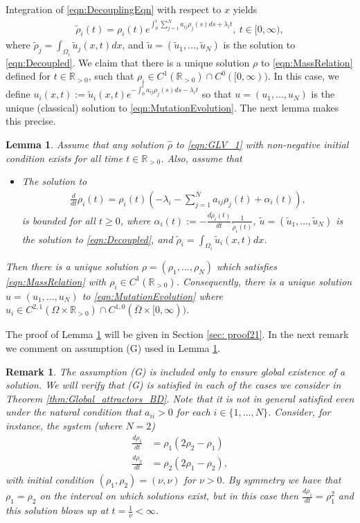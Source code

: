 \documentclass{article}
\newtheorem{lemma}{Lemma}[section]
\newtheorem{rmk}{Remark}[section]
\begin{document}
Integration of \eqref{eqn:DecouplingEqn} with respect to $x$ yields
\begin{align}\label{eqn:MassRelation}
    \tilde{\rho}_i(t)=\rho_i(t)e^{\int_{0}^t\sum_{j=1}^Na_{ij}\rho_j(s)ds+\lambda_it},~t\in[0,\infty),
\end{align}
where $\tilde{\rho}_j=\int_{\Omega_i}\tilde{u}_j(x,t)dx$, and $\tilde{u}=(\tilde{u}_1,...,\tilde{u}_N)$ is the solution to \eqref{eqn:Decoupled}. We claim that there is a unique solution $\rho$ to \eqref{eqn:MassRelation} defined for $t\in\mathbb{R}_{>0}$, such that $\rho_i\in{}C^1(\mathbb{R}_{>0})\cap{}C^0([0,\infty))$. In this case, we define
$u_i(x,t):=\tilde{u}_i(x,t)e^{-\int_{0}^ta_{ij}\rho_j(s)ds-\lambda_it}$ so that $u=(u_1,...,u_N)$ is the unique (classical) solution to \eqref{eqn:MutationEvolution}. The next lemma makes this precise.
\begin{lemma}\label{lma:MassEquivalent}
Assume that any solution $\hat{\rho}$ to 
\eqref{eqn:GLV_1}
with non-negative initial condition exists for all time $t\in\mathbb{R}_{>0}$. Also, assume that
\begin{itemize}
   \item[(G)] {The solution to}
        \begin{align*}
        \frac{d}{dt}\rho_i(t)=\rho_i(t)\left(-\lambda_i-\sum_{j=1}^Na_{ij}\rho_j(t)+\alpha_i(t)\right),
    \end{align*} 
     {is bounded for all $t\geq{0}$, where $\alpha_i(t):=-\frac{d\tilde{\rho}_i(t)}{dt}\frac{1}{\tilde{\rho}_i(t)}$, $\tilde{u}=(\tilde{u}_1,...,\tilde{u}_N)$ is the solution to \eqref{eqn:Decoupled}, and $\tilde{\rho}_i=\int_{\Omega_i}\tilde{u}_i(x,t)dx$.}
\end{itemize}
Then there is a unique solution $\rho=(\rho_1,...,\rho_N)$ which satisfies \eqref{eqn:MassRelation} with $\rho_i\in{}C^1(\mathbb{R}_{>0})$. Consequently, there is a unique solution $u=(u_1,...,u_N)$ to \eqref{eqn:MutationEvolution} where  $u_i\in{}C^{2,1}(\Omega\times\mathbb{R}_{>0})\cap{}C^{1,0}(\bar{\Omega}\times[0,\infty))$.
\end{lemma}
The proof of Lemma \ref{lma:MassEquivalent} will be given in Section \ref{sec: proof21}. In the next remark we comment on assumption (G) used in Lemma \ref{lma:MassEquivalent}.
\begin{rmk}
    The assumption (G) is included only to ensure global existence of a solution. We will verify that (G) is satisfied in each of the cases we consider in Theorem \ref{thm:Global_attractors_BD}. Note that it is \textit{not} in general satisfied even under the natural condition that $a_{ii}>0$ for each $i\in\{1,...,N\}$. Consider, for instance, the system (where $N=2$)
    \begin{align*}
        \frac{d\rho_1}{dt}&=\rho_1(2\rho_2-\rho_1)\\
        \frac{d\rho_2}{dt}&=\rho_2(2\rho_1-\rho_2),
    \end{align*}
    with initial condition $(\rho_1,\rho_2)=(\nu,\nu)$ for $\nu>0$. By symmetry we have that $\rho_1=\rho_2$ on the interval on which solutions exist, but in this case then $\frac{d\rho_1}{dt}=\rho_1^2$ and this solution blows up at $t=\frac{1}{\nu}<\infty$.
\end{rmk}
\end{document}
